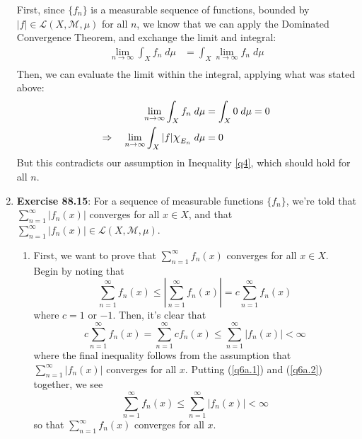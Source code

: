 \documentclass[12pt]{article}
\theoremstyle{plain}
\theoremstyle{definition}
\theoremstyle{remark}
\newcommand*{\Chi}{\mbox{\large$\chi$}} %
\begin{document}
\begin{enumerate}
First, since $\{f_n\}$ is a measurable sequence of functions, bounded by $|f|\in\mathscr{L}(X,\mathscr{M},\mu)$ for all $n$, we know that we can apply the Dominated Convergence Theorem, and exchange the limit and integral:
\begin{align*}
    \lim_{n\rightarrow\infty} \int_X f_n \; d\mu&=
    \int_X \lim_{n\rightarrow\infty}f_n \; d\mu  \\ 
\end{align*}
Then, we can evaluate the limit within the integral, applying what was stated above:
\begin{align*}
    \lim_{n\rightarrow\infty} \int_X f_n \; d\mu &=
    \int_X 0 \; d\mu = 0 \\ 
    \Rightarrow\quad
    \lim_{n\rightarrow\infty} \int_X |f|\Chi_{E_n} \; 
    d\mu &= 0
\end{align*}
But this contradicts our assumption in Inequality \ref{q4}, which should hold for all $n$.


\newpage 
\item \textbf{Exercise 88.15}: For a sequence of measurable functions $\{f_n\}$, we're told that $\sum^\infty_{n=1} |f_n(x)|$ converges for all $x\in X$, and that $\sum^\infty_{n=1}|f_n(x)|\in\mathscr{L}(X,\mathscr{M},\mu)$. 
\begin{enumerate}
    \item First, we want to prove that $\sum^\infty_{n=1} f_n(x)$ converges for all $x\in X$. Begin by noting that 
\begin{equation}
    \label{q6a.1}
    \sum^\infty_{n=1} f_n(x) \leq 
    \left\lvert\sum^\infty_{n=1} f_n(x)\right\rvert =
    c \sum^\infty_{n=1} f_n(x)
\end{equation}
where $c=1$ or $-1$. Then, it's clear that 
\begin{equation}
    \label{q6a.2}
    c \sum^\infty_{n=1} f_n(x) =
    \sum^\infty_{n=1} c f_n(x) \leq
    \sum^\infty_{n=1} \left\lvert f_n(x) \right\rvert
    <\infty
\end{equation}
where the final inequality follows from the assumption that $\sum^\infty_{n=1} |f_n(x)|$ converges for all $x$. Putting (\ref{q6a.1}) and (\ref{q6a.2}) together, we see
\begin{equation}
    \sum^\infty_{n=1} f_n(x) \leq 
    \sum^\infty_{n=1} \left\lvert f_n(x) \right\rvert
    <\infty
\end{equation}
so that $\sum^\infty_{n=1} f_n(x)$ converges for all $x$.


\end{enumerate}
\end{enumerate}
\end{document}
